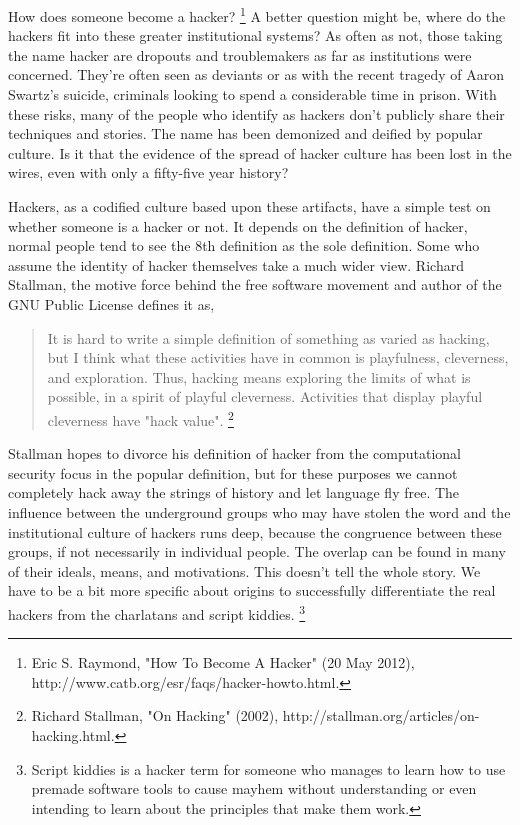 \documentclass[11pt]{article}
\begin{document}
How does someone become a hacker?
\footnote{Eric S. Raymond, "How To Become A Hacker" (20 May 2012), http://www.catb.org/esr/faqs/hacker-howto.html.}
A better question might be, where do the hackers fit into these greater institutional systems? As often as not, those taking the name hacker are dropouts and troublemakers as far as institutions were concerned. They're often seen as deviants or as with the recent tragedy of Aaron Swartz's suicide, criminals looking to spend a considerable time in prison. With these risks, many of the people who identify as hackers don't publicly share their techniques and stories. The name has been demonized and deified by popular culture. Is it that the evidence of the spread of hacker culture has been lost in the wires, even with only a fifty-five year history?

Hackers, as a codified culture based upon these artifacts, have a simple test on whether someone is a hacker or not. It depends on the definition of hacker, normal people tend to see the 8th definition as the sole definition. Some who assume the identity of hacker themselves take a much wider view.  Richard Stallman, the motive force behind the free software movement and author of the GNU Public License defines it as, 

\begin{quote}
It is hard to write a simple definition of something as varied as hacking, but I think what these activities have in common is playfulness, cleverness, and exploration. Thus, hacking means exploring the limits of what is possible, in a spirit of playful cleverness. Activities that display playful cleverness have "hack value".
\footnote{Richard Stallman, "On Hacking" (2002), http://stallman.org/articles/on-hacking.html.}
\end{quote}

Stallman hopes to divorce his definition of hacker from the computational security focus in the popular definition, but for these purposes we cannot completely hack away the strings of history and let language fly free. The influence between the underground groups who may have stolen the word and the institutional culture of hackers runs deep, because the congruence between these groups, if not necessarily in individual people. The overlap can be found in many of their ideals, means, and motivations. This doesn't tell the whole story. We have to be a bit more specific about origins to successfully differentiate the real hackers from the charlatans and script kiddies.
\footnote{Script kiddies is a hacker term for someone who manages to learn how to use premade software tools to cause mayhem without understanding or even intending to learn about the principles that make them work.}
\end{document}
